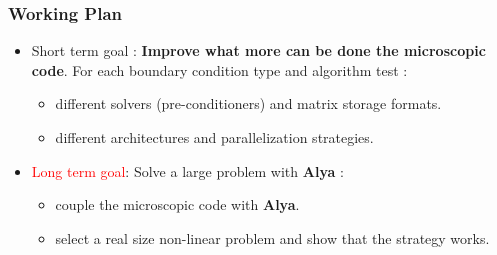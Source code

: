 \documentclass[usenames,dvipsnames]{beamer}
\begin{document}
\begin{frame}
\frametitle{Working Plan}

\begin{itemize}
\item \textcolor{OliveGreen}{Short term goal} : \textbf{Improve  what more can be done the microscopic code}. 
For each boundary condition type and algorithm test :
 \begin{itemize}
  \item different solvers (pre-conditioners) and matrix storage formats.
  \item different architectures and parallelization strategies.
 \end{itemize}

 \item \textcolor{Red}{Long term goal}: Solve a large problem with \textbf{Alya} :
 \begin{itemize}
  \item couple the microscopic code with \textbf{Alya}.
  \item select a real size non-linear problem and show that the strategy works.
 \end{itemize}
\end{itemize}

\begin{figure}[hhh!]
\begin{center}
\end{center}
\end{figure}

\end{frame}

\end{document}
